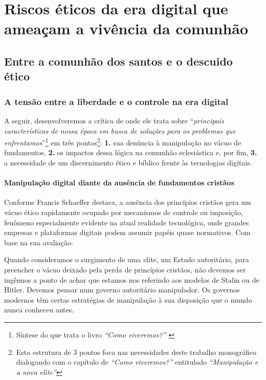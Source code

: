\chapter{Riscos éticos da era digital que ameaçam a vivência da comunhão}

\section{Entre a comunhão dos santos e o descuido ético}

\subsection{A tensão entre a liberdade e o controle na era digital}

A seguir, desenvolveremos a crítica de  onde ele trata sobre ``\textit{principais características de nossa época em busca de soluções para os problemas que enfrentamos}''\footnote{Síntese do que trata o livro \textit{``Como viveremos?''} \cite{schaeffer2002}} em três pontos\footnote{Esta estrutura de 3 pontos foca nas necessidades deste trabalho monográfico dialogando com o capítulo de \textit{``Como viveremos?''} entitulado \textit{``Manipulação e a nova elite''}}: \textbf{1.} sua denúncia à manipulação no vácuo de fundamentos, \textbf{2.} os impactos dessa lógica na comunhão eclesiástica e, por fim, \textbf{3.} a necessidade de um discernimento ético e bíblico frente às tecnologias digitais.

\subsubsection{Manipulação digital diante da ausência de fundamentos cristãos}

Conforme Francis Schaeffer destaca, a ausência dos princípios cristãos gera um vácuo ético rapidamente ocupado por mecanismos de controle ou imposição, fenômeno especialmente evidente na atual realidade tecnológica, onde grandes empresas e plataformas digitais podem assumir papéis quase normativos. Com base na sua avaliação:

\begin{citacao}
    Quando consideramos o surgimento de uma elite, um Estado autoritário, para preencher o vácuo deixado pela perda de princípios cristãos, não devemos ser ingênuos a ponto de achar que estamos nos referindo aos modelos de Stalin ou de Hitler. Devemos pensar num governo autoritário manipulador. Os governos modernos têm certas estratégias de manipulação à sua disposição que o mundo nunca conheceu antes. \cite[p.~168]{schaeffer2002}
\end{citacao}

